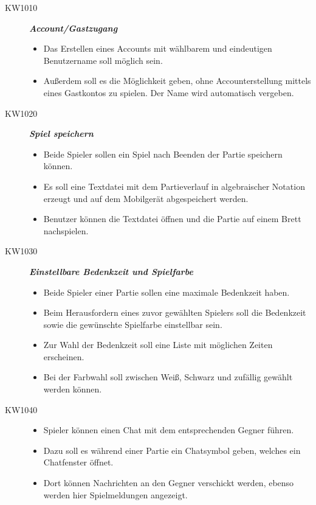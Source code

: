 \documentclass[parskip=full]{scrartcl}
\begin{document}
	\begin{description}
		
		\item[KW1010] \textbf{\textit{Account/Gastzugang}}
		\begin{itemize}
			\item Das Erstellen eines Accounts mit wählbarem und eindeutigen Benutzername soll 		möglich sein.
			\item Außerdem soll es die Möglichkeit geben, ohne Accounterstellung mittels eines 		Gastkontos zu spielen. Der Name wird automatisch vergeben.		
		\end{itemize}
		
		\item[KW1020] \textbf{\textit{Spiel speichern}}
		\begin{itemize}
			\item Beide Spieler sollen ein Spiel nach Beenden der Partie speichern können.
			\item Es soll eine Textdatei mit dem Partieverlauf in algebraischer \gls{Notation} erzeugt und auf dem Mobilgerät abgespeichert werden.
			\item Benutzer können die Textdatei öffnen und die Partie auf einem Brett nachspielen.
		\end{itemize}
		
		\item[KW1030] \textbf{\textit{Einstellbare Bedenkzeit und Spielfarbe}}
		\begin{itemize}
			\item Beide Spieler einer Partie sollen eine maximale \gls{Bedenkzeit} haben.
			\item Beim Herausfordern eines zuvor gewählten Spielers soll die \gls{Bedenkzeit} sowie die gewünschte Spielfarbe einstellbar sein.
			\item Zur Wahl der \gls{Bedenkzeit} soll eine Liste mit möglichen Zeiten erscheinen.
			\item Bei der Farbwahl soll zwischen Weiß, Schwarz und zufällig gewählt werden können.
		\end{itemize}
		
		\item[KW1040] 
		\begin{itemize} \textbf{\textit{Chat}}
			\item \gls{Spieler} können einen Chat mit dem entsprechenden Gegner führen.
			\item Dazu soll es während einer Partie ein Chatsymbol geben, welches ein Chatfenster öffnet.
			\item Dort können Nachrichten an den Gegner verschickt werden, ebenso werden hier Spielmeldungen angezeigt.
		\end{itemize}
		

\end{description}
\end{document}
